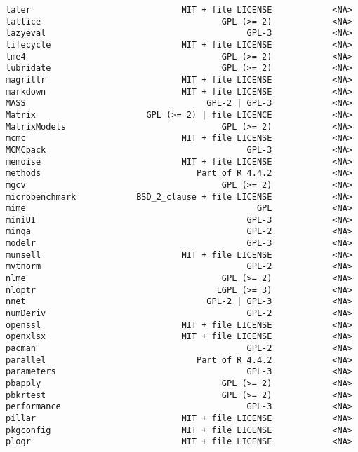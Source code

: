 \documentclass[
  letterpaper,
  DIV=11,
  numbers=noendperiod]{scrreprt}
\begin{document}
\begin{verbatim}
later                              MIT + file LICENSE            <NA>
lattice                                    GPL (>= 2)            <NA>
lazyeval                                        GPL-3            <NA>
lifecycle                          MIT + file LICENSE            <NA>
lme4                                       GPL (>= 2)            <NA>
lubridate                                  GPL (>= 2)            <NA>
magrittr                           MIT + file LICENSE            <NA>
markdown                           MIT + file LICENSE            <NA>
MASS                                    GPL-2 | GPL-3            <NA>
Matrix                      GPL (>= 2) | file LICENCE            <NA>
MatrixModels                               GPL (>= 2)            <NA>
mcmc                               MIT + file LICENSE            <NA>
MCMCpack                                        GPL-3            <NA>
memoise                            MIT + file LICENSE            <NA>
methods                               Part of R 4.4.2            <NA>
mgcv                                       GPL (>= 2)            <NA>
microbenchmark            BSD_2_clause + file LICENSE            <NA>
mime                                              GPL            <NA>
miniUI                                          GPL-3            <NA>
minqa                                           GPL-2            <NA>
modelr                                          GPL-3            <NA>
munsell                            MIT + file LICENSE            <NA>
mvtnorm                                         GPL-2            <NA>
nlme                                       GPL (>= 2)            <NA>
nloptr                                    LGPL (>= 3)            <NA>
nnet                                    GPL-2 | GPL-3            <NA>
numDeriv                                        GPL-2            <NA>
openssl                            MIT + file LICENSE            <NA>
openxlsx                           MIT + file LICENSE            <NA>
pacman                                          GPL-2            <NA>
parallel                              Part of R 4.4.2            <NA>
parameters                                      GPL-3            <NA>
pbapply                                    GPL (>= 2)            <NA>
pbkrtest                                   GPL (>= 2)            <NA>
performance                                     GPL-3            <NA>
pillar                             MIT + file LICENSE            <NA>
pkgconfig                          MIT + file LICENSE            <NA>
plogr                              MIT + file LICENSE            <NA>

\end{verbatim}
\end{document}
